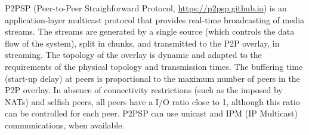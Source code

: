 

P2PSP (Peer-to-Peer Straighforward Protocol,
\url{https://p2psp.github.io}) is an application-layer multicast
protocol that provides real-time broadcasting of media streams. The
streams are generated by a single source (which controls the data flow
of the system), split in chunks, and transmitted to the P2P overlay,
in streaming. The topology of the overlay is dynamic and adapted to
the requirements of the physical topology and transmission times. The
buffering time (start-up delay) at peers is proportional to the
maximum number of peers in the P2P overlay. In absence of connectivity
restrictions (such as the imposed by NATs) and selfish peers, all
peers have a I/O ratio close to 1, although this ratio can be
controlled for each peer. P2PSP can use unicast and IPM (IP Multicast)
communications, when available.
